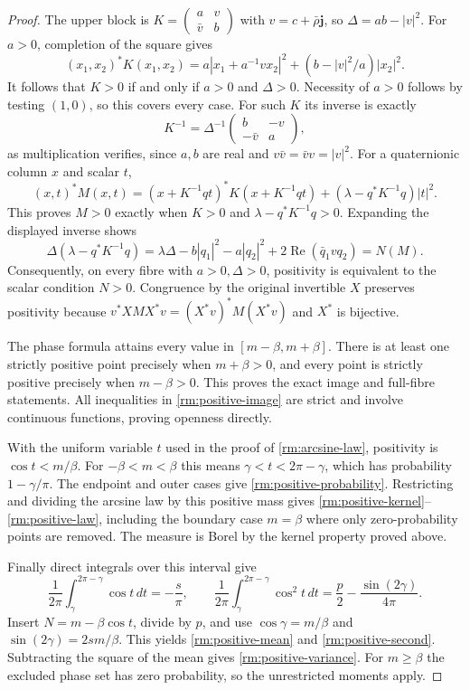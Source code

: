 \begin{proof}
The upper block is
$K=\left(\begin{smallmatrix}a&v\\\bar v&b\end{smallmatrix}\right)$
with $v=c+\bar\rho\mathbf j$, so
$\Delta=ab-|v|^2$. For $a>0$, completion of the square gives
\[
 (x_1,x_2)^*K(x_1,x_2)
 =a|x_1+a^{-1}v x_2|^2+(b-|v|^2/a)|x_2|^2.
\]
It follows that $K>0$ if and only if $a>0$ and $\Delta>0$.
Necessity of $a>0$ follows by testing $(1,0)$, so this covers every
case. For such $K$ its inverse is exactly
\[
 K^{-1}=\Delta^{-1}\begin{pmatrix}b&-v\\-\bar v&a\end{pmatrix},
\]
as multiplication verifies, since $a,b$ are real and
$v\bar v=\bar vv=|v|^2$. For a quaternionic column $x$ and scalar $t$,
\[
 (x,t)^*M(x,t)
  =(x+K^{-1}qt)^*K(x+K^{-1}qt)
      +(\lambda-q^*K^{-1}q)|t|^2.
\]
This proves $M>0$ exactly when $K>0$ and
$\lambda-q^*K^{-1}q>0$. Expanding the displayed inverse shows
\[
 \Delta(\lambda-q^*K^{-1}q)
 =\lambda\Delta-b|q_1|^2-a|q_2|^2
                       +2\operatorname{Re}(\bar q_1vq_2)=N(M).
\]
Consequently, on every fibre with $a>0,\Delta>0$, positivity is
equivalent to the scalar condition $N>0$. Congruence by the original
invertible $X$ preserves positivity because
$v^*XMX^*v=(X^*v)^*M(X^*v)$ and $X^*$ is bijective.

The phase formula attains every value in $[m-\beta,m+\beta]$.
There is at least one strictly positive point precisely when
$m+\beta>0$, and every point is strictly positive precisely when
$m-\beta>0$. This proves the exact image and full-fibre statements.
All inequalities in \eqref{rm:positive-image} are strict and involve
continuous functions, proving openness directly.

With the uniform variable $t$ used in the proof of
\eqref{rm:arcsine-law}, positivity is $\cos t<m/\beta$.
For $-\beta<m<\beta$ this means $\gamma<t<2\pi-\gamma$, which
has probability $1-\gamma/\pi$. The endpoint and outer cases give
\eqref{rm:positive-probability}. Restricting and dividing the
arcsine law by this positive mass gives
\eqref{rm:positive-kernel}--\eqref{rm:positive-law}, including the
boundary case $m=\beta$ where only zero-probability points are
removed. The measure is Borel by the kernel property proved above.

Finally direct integrals over this interval give
\[
 \frac1{2\pi}\int_\gamma^{2\pi-\gamma}\cos t\,dt
       =-\frac{s}{\pi},\qquad
 \frac1{2\pi}\int_\gamma^{2\pi-\gamma}\cos^2t\,dt
       =\frac p2-\frac{\sin(2\gamma)}{4\pi}.
\]
Insert $N=m-\beta\cos t$, divide by $p$, and use
$\cos\gamma=m/\beta$ and $\sin(2\gamma)=2s m/\beta$.
This yields \eqref{rm:positive-mean} and
\eqref{rm:positive-second}. Subtracting the square of the mean
gives \eqref{rm:positive-variance}. For $m\geq\beta$ the excluded
phase set has zero probability, so the unrestricted moments apply.
\end{proof}

